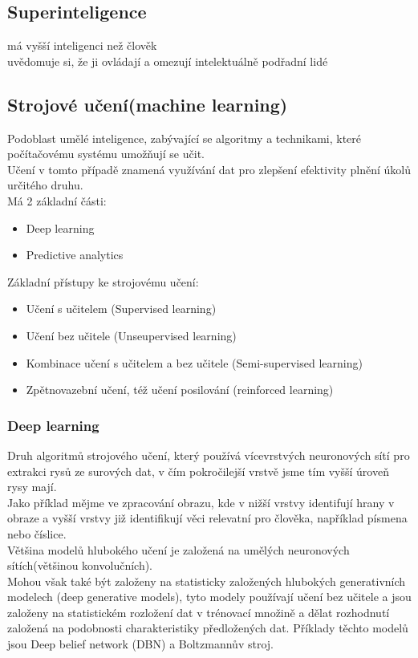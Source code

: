 \subsection*{Superinteligence}
má vyšší inteligenci než člověk\\
uvědomuje si, že ji ovládají a omezují intelektuálně podřadní lidé\\



\subsection{Strojové učení(machine learning)}
Podoblast umělé inteligence, zabývající se algoritmy a technikami, které počítačovému systému umožňují se učit.\\
Učení v tomto případě znamená využívání dat pro zlepšení efektivity plnění úkolů určitého druhu.\\
Má 2 základní části:
\begin{itemize}
    \item Deep learning
    \item Predictive analytics
\end{itemize}

Základní přístupy ke strojovému učení:
\begin{itemize}
    \item Učení s učitelem (Supervised learning)
    \item Učení bez učitele (Unseupervised learning)
    \item Kombinace učení s učitelem a bez učitele (Semi-supervised learning)
    \item Zpětnovazební učení, též učení posilování (reinforced learning)
\end{itemize}

\subsubsection{Deep learning}
Druh algoritmů strojového učení, který používá vícevrstvých neuronových sítí pro extrakci rysů ze surových dat, v čím pokročilejší vrstvě jsme tím vyšší úroveň rysy mají.\\
Jako příklad mějme ve zpracování obrazu, kde v nižší vrstvy identifují hrany v obraze a vyšší vrstvy již identifikují věci relevatní pro člověka, například písmena nebo číslice.\\
Většina modelů hlubokého učení je založená na umělých neuronových sítích(většinou konvolučních).\\
Mohou však také být založeny na statisticky založených hlubokých generativních modelech (deep generative models), tyto modely používají učení bez učitele a jsou založeny na statistickém rozložení dat v trénovací množině a dělat rozhodnutí založená na podobnosti charakteristiky předložených dat. Příklady těchto modelů jsou Deep belief network (DBN) a Boltzmannův stroj.\\
